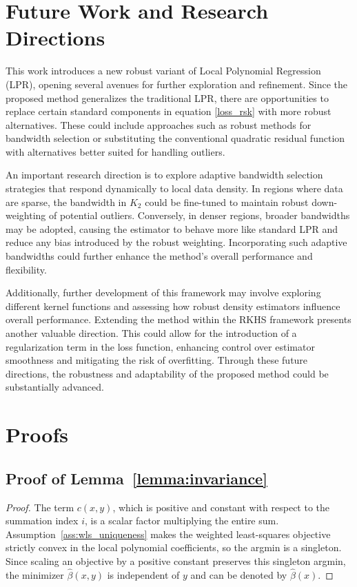\documentclass[preprint,1p,times,authoryear]{elsarticle}
\begin{document}
\section{Future Work and Research Directions}
\label{S:Future work and research directions}

This work introduces a new robust variant of Local Polynomial Regression (LPR), opening several avenues for further exploration and refinement. Since the proposed method generalizes the traditional LPR, there are opportunities to replace certain standard components in equation \eqref{loss_rsk} with more robust alternatives. These could include approaches such as robust methods for bandwidth selection or substituting the conventional quadratic residual function with alternatives better suited for handling outliers.

An important research direction is to explore adaptive bandwidth selection strategies that respond dynamically to local data density. In regions where data are sparse, the bandwidth in \(K_2\) could be fine-tuned to maintain robust down-weighting of potential outliers. Conversely, in denser regions, broader bandwidths may be adopted, causing the estimator to behave more like standard LPR and reduce any bias introduced by the robust weighting. Incorporating such adaptive bandwidths could further enhance the method’s overall performance and flexibility.

Additionally, further development of this framework may involve exploring different kernel functions and assessing how robust density estimators influence overall performance. Extending the method within the RKHS framework presents another valuable direction. This could allow for the introduction of a regularization term in the loss function, enhancing control over estimator smoothness and mitigating the risk of overfitting. Through these future directions, the robustness and adaptability of the proposed method could be substantially advanced.





\clearpage
\appendix
\section{Proofs}
\label{appendix:proofs}

\subsection{Proof of Lemma~\ref{lemma:invariance}}
\label{appendix:proof_invariance}
\begin{proof}
The term \( c(x,y) \), which is positive and constant with respect to the summation index \(i\), is a scalar factor multiplying the entire sum. Assumption~\ref{ass:wls_uniqueness} makes the weighted least-squares objective strictly convex in the local polynomial coefficients, so the argmin is a singleton. Since scaling an objective by a positive constant preserves this singleton argmin, the minimizer \(\hat\beta(x,y)\) is independent of \(y\) and can be denoted by \(\hat\beta(x)\).
\end{proof}
\end{document}
